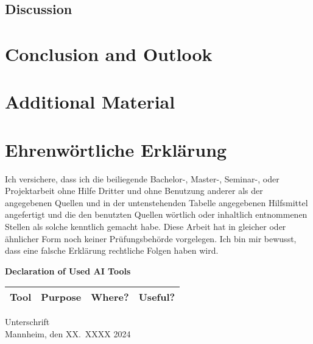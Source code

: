 \documentclass[a4paper,oneside,bibliography=totoc]{scrbook}
\begin{document}
\section{Discussion}


\chapter{Conclusion and Outlook}




\appendix
\chapter{Additional Material}


\backmatter
\chapter{Ehrenwörtliche Erklärung}

Ich versichere, dass ich die beiliegende Bachelor-, Master-, Seminar-, oder
Projektarbeit ohne Hilfe Dritter und ohne Benutzung anderer als der angegebenen
Quellen und in der untenstehenden Tabelle angegebenen Hilfsmittel angefertigt
und die den benutzten Quellen wörtlich oder inhaltlich entnommenen Stellen als
solche kenntlich gemacht habe. Diese Arbeit hat in gleicher oder ähnlicher Form
noch keiner Prüfungsbehörde vorgelegen. Ich bin mir bewusst, dass eine falsche
Erklärung rechtliche Folgen haben wird.

\begin{center}
  \textbf{Declaration of Used AI Tools} \\[.3em]
  \begin{tabularx}{\textwidth}{lXlc}
    \toprule
    Tool & Purpose & Where? & Useful? \\
    \midrule
    \bottomrule
  \end{tabularx}
\end{center}

\vspace{2cm}
\noindent Unterschrift\\
\noindent Mannheim, den XX.~XXXX 2024 \hfill
\end{document}
